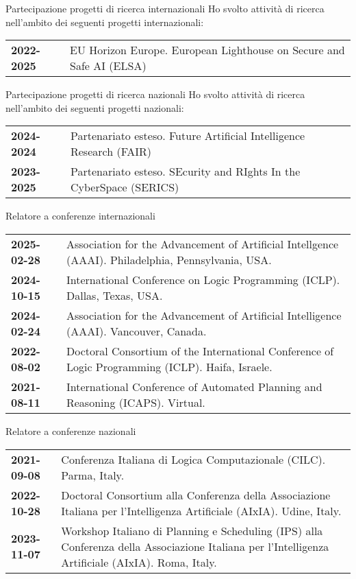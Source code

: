 \documentclass{resume} %
\begin{document}
\begin{rSection}{Partecipazione progetti di ricerca internazionali}
Ho svolto attività di ricerca nell'ambito dei seguenti progetti internazionali:\\
	\begin{tabularx}{0.95\textwidth} {lp{14cm}}
 \textbf{2022-2025} & EU Horizon Europe. European Lighthouse on Secure and Safe AI (ELSA)
 \end{tabularx}
\end{rSection}

\begin{rSection}{Partecipazione progetti di ricerca nazionali}
Ho svolto attività di ricerca nell'ambito dei seguenti progetti nazionali:\\
	\begin{tabularx}{0.95\textwidth} {lp{14cm}}
  \textbf{2024-2024} & Partenariato esteso. Future Artificial Intelligence Research (FAIR)\\
 \textbf{2023-2025} & Partenariato esteso. SEcurity and RIghts In the CyberSpace (SERICS)\\
 \end{tabularx}
\end{rSection}

\begin{rSection}{Relatore a conferenze internazionali}
	\begin{tabularx}{0.95\textwidth} {lp{14cm}}
 \textbf{2025-02-28} & Association for the Advancement of Artificial Intellgence (AAAI). Philadelphia, Pennsylvania, USA.\\
 \textbf{2024-10-15} & International Conference on Logic Programming (ICLP). Dallas, Texas, USA.\\
 \textbf{2024-02-24} & Association for the Advancement of Artificial Intelligence (AAAI). Vancouver, Canada.\\
 \textbf{2022-08-02} & Doctoral Consortium of the International Conference of Logic Programming (ICLP). Haifa, Israele.\\
 \textbf{2021-08-11} & International Conference of Automated Planning and Reasoning (ICAPS). Virtual.\\
 \end{tabularx}
 \end{rSection}
 

 \begin{rSection}{Relatore a conferenze nazionali}
	\begin{tabularx}{0.95\textwidth} {lp{14cm}}
 \textbf{2021-09-08} & Conferenza Italiana di Logica Computazionale (CILC).  Parma, Italy.\\
 \textbf{2022-10-28} & Doctoral Consortium alla Conferenza della Associazione Italiana per l'Intelligenza Artificiale (AIxIA). Udine, Italy.\\
 \textbf{2023-11-07} & Workshop Italiano di Planning e Scheduling (IPS) alla Conferenza della Associazione Italiana per l'Intelligenza Artificiale (AIxIA). Roma, Italy.
  \end{tabularx}
 \end{rSection}
 
\end{document}
